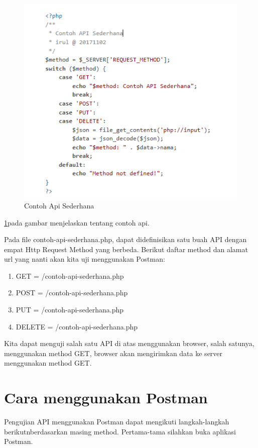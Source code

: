 \documentclass[12pt,a4paper]{article}
\begin{document}
\begin{figure}[ht]
\centerline{\includegraphics[width=1\textwidth]{figures/3contohapi.PNG}}
\caption{Contoh Api Sederhana} 
\label{api}
\end{figure}
\ref{api}pada gambar menjelaskan tentang contoh api.

Pada file contoh-api-sederhana.php, dapat didefinisikan satu buah API dengan empat Http Request Method yang berbeda. Berikut daftar method dan alamat url yang nanti akan kita uji menggunakan Postman:
\begin{enumerate}
\item GET = /contoh-api-sederhana.php
\item POST = /contoh-api-sederhana.php
\item PUT = /contoh-api-sederhana.php
\item DELETE = /contoh-api-sederhana.php
\end{enumerate}
Kita dapat menguji salah satu API di atas menggunakan browser, salah satunya, menggunakan method GET, browser akan mengirimkan data ke server menggunakan method GET.
\section{Cara menggunakan Postman}
Pengujian API menggunakan Postman dapat mengikuti langkah-langkah berikutnberdasarkan masing method. Pertama-tama silahkan buka aplikasi Postman.
\end{document}
